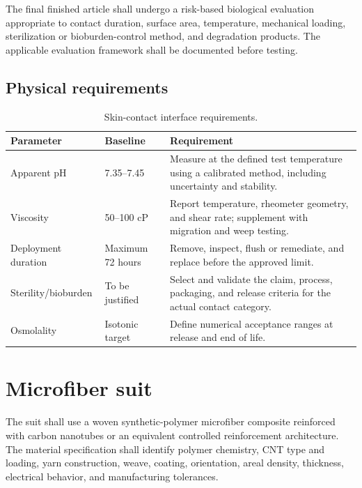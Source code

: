 \documentclass[11pt,a4paper]{article}
\begin{document}
The final finished article shall undergo a risk-based biological evaluation appropriate to contact duration, surface area, temperature, mechanical loading, sterilization or bioburden-control method, and degradation products. The applicable evaluation framework shall be documented before testing.

\subsection{Physical requirements}
\begin{longtable}{p{}p{}p{}}
\caption{Skin-contact interface requirements.}\label{tab:interface-requirements}\\
\toprule
\textbf{Parameter} & \textbf{Baseline} & \textbf{Requirement}\\
\midrule
Apparent pH & 7.35--7.45 & Measure at the defined test temperature using a calibrated method, including uncertainty and stability.\\
Viscosity & 50--100 cP & Report temperature, rheometer geometry, and shear rate; supplement with migration and weep testing.\\
Deployment duration & Maximum 72 hours & Remove, inspect, flush or remediate, and replace before the approved limit.\\
Sterility/bioburden & To be justified & Select and validate the claim, process, packaging, and release criteria for the actual contact category.\\
Osmolality & Isotonic target & Define numerical acceptance ranges at release and end of life.\\
\bottomrule
\end{longtable}

\section{Microfiber suit}\label{sec:suit}
The suit shall use a woven synthetic-polymer microfiber composite reinforced with carbon nanotubes or an equivalent controlled reinforcement architecture. The material specification shall identify polymer chemistry, CNT type and loading, yarn construction, weave, coating, orientation, areal density, thickness, electrical behavior, and manufacturing tolerances.
\end{document}
